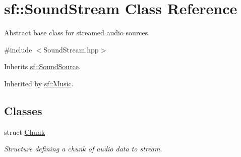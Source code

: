 \hypertarget{classsf_1_1_sound_stream}{\section{sf\+:\+:Sound\+Stream Class Reference}
\label{classsf_1_1_sound_stream}
}


Abstract base class for streamed audio sources.  




{\ttfamily \#include $<$Sound\+Stream.\+hpp$>$}



Inherits \hyperlink{classsf_1_1_sound_source}{sf\+::\+Sound\+Source}.



Inherited by \hyperlink{classsf_1_1_music}{sf\+::\+Music}.

\subsection*{Classes}
\begin{DoxyCompactItemize}
\item 
struct \hyperlink{structsf_1_1_sound_stream_1_1_chunk}{Chunk}
\begin{DoxyCompactList}\small\item\em Structure defining a chunk of audio data to stream. \end{DoxyCompactList}\end{DoxyCompactItemize}
